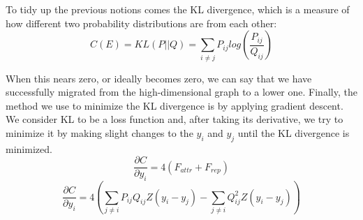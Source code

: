 To tidy up the previous notions comes the KL divergence, which is a measure of how different two probability
distributions are from each other:
$$C(E) = KL(P||Q) = \sum_{i \neq j} P_{ij} log\left(\frac{P_{ij}}{Q_{ij}}\right)$$
\cite[page 3225]{accelerating_tsne}

When this nears zero, or ideally becomes zero, we can say that we have successfully migrated from the 
high-dimensional graph to a lower one. Finally, the method we use to minimize the KL divergence is by
applying gradient descent. We consider KL to be a loss function and, after taking its derivative, we
try to minimize it by making slight changes to the $y_i$ and $y_j$ until the KL divergence is minimized.
$$\frac{\partial C}{\partial y_i} = 4(F_{attr} + F_{rep})$$
$$\frac{\partial C}{\partial y_i} = 4\left(\sum_{j \neq i} P_{ij} Q_{ij} Z(y_i - y_j) - \sum_{j \neq i} Q_{ij}^2 Z(y_i - y_j)\right)$$
\cite[page 3227]{accelerating_tsne}
